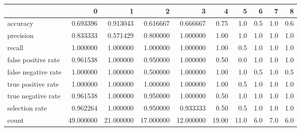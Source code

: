 \begin{tabular}{lrrrrrrrrr}
\toprule
{} &          0 &          1 &          2 &          3 &      4 &     5 &    6 &    7 &    8 \\
\midrule
accuracy            &   0.693396 &   0.913043 &   0.616667 &   0.666667 &   0.75 &   1.0 &  0.5 &  1.0 &  0.6 \\
precision           &   0.833333 &   0.571429 &   0.800000 &   1.000000 &   1.00 &   1.0 &  1.0 &  1.0 &  1.0 \\
recall              &   1.000000 &   1.000000 &   1.000000 &   1.000000 &   1.00 &   0.5 &  1.0 &  1.0 &  1.0 \\
false positive rate &   0.961538 &   1.000000 &   0.950000 &   1.000000 &   0.50 &   0.0 &  1.0 &  1.0 &  1.0 \\
false negative rate &   1.000000 &   1.000000 &   0.500000 &   1.000000 &   1.00 &   1.0 &  0.5 &  1.0 &  0.5 \\
true positive rate  &   1.000000 &   1.000000 &   1.000000 &   1.000000 &   1.00 &   0.5 &  1.0 &  1.0 &  1.0 \\
true negative rate  &   0.961538 &   1.000000 &   0.950000 &   1.000000 &   0.50 &   1.0 &  1.0 &  1.0 &  1.0 \\
selection rate      &   0.962264 &   1.000000 &   0.950000 &   0.933333 &   0.50 &   0.5 &  1.0 &  1.0 &  1.0 \\
count               &  49.000000 &  21.000000 &  17.000000 &  12.000000 &  19.00 &  11.0 &  6.0 &  7.0 &  6.0 \\
\bottomrule
\end{tabular}
